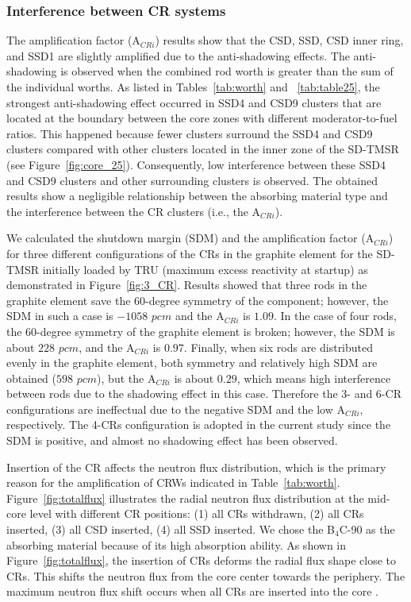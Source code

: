 \subsubsection{Interference between CR systems}

The amplification factor (A$_{CRi}$) results show that the CSD, SSD, CSD inner 
ring, and SSD1 are slightly amplified due to the anti-shadowing effects. The 
anti-shadowing is observed when the combined rod worth is greater than the sum 
of the individual worths. As listed in Tables~\ref{tab:worth} and ~\ref{tab:table25}, the strongest anti-shadowing effect occurred in 
SSD4 and CSD9 clusters that are located at the boundary between the core zones 
with different moderator-to-fuel ratios. This happened because fewer clusters surround the SSD4 and CSD9 clusters compared with other clusters located in the inner zone of the SD-TMSR (see Figure~\ref{fig:core_25}). Consequently, low interference between these SSD4 and CSD9 clusters and other surrounding clusters is observed. The obtained results show a negligible relationship between the absorbing material type and the interference between the CR clusters (i.e., the A$_{CRi}$).

We calculated the shutdown margin (SDM) and the amplification factor (A$_{CRi}$) for three different configurations of the CRs in the graphite element for the SD-TMSR initially loaded by TRU (maximum excess reactivity at startup) as demonstrated in Figure~\ref{fig:3_CR}. Results showed that three rods in the graphite element save the 60-degree symmetry of the component; however, the SDM in such a case is $-1058$ $pcm$ and the A$_{CRi}$ is $1.09$. In the case of four rods, the 60-degree symmetry of the graphite element is broken; however, the SDM is about $228$ $pcm$, and the A$_{CRi}$ is $0.97$. Finally, when six rods are distributed evenly in the graphite element, both symmetry and relatively high SDM are obtained ($598$ $pcm$), but the A$_{CRi}$ is about $0.29$, which means high interference between rods due to the shadowing effect in this case. Therefore the 3- and 6-CR configurations are ineffectual due to the negative SDM and the low A$_{CRi}$, respectively. The 4-CRs configuration is adopted in the current study since the SDM is positive, and almost no shadowing effect has been observed.

Insertion of the CR affects the neutron flux distribution, which is 
the primary reason for the amplification of CRWs indicated in 
Table~\ref{tab:worth}. Figure~\ref{fig:totalflux} illustrates the radial 
neutron flux distribution at the mid-core level with different CR positions: 
(1) all CRs withdrawn, (2) all CRs inserted, (3) all CSD inserted, (4) all SSD 
inserted. We chose the B$_4$C-90 as the absorbing material because of its high 
absorption ability. As shown in Figure~\ref{fig:totalflux}, the insertion of 
CRs deforms the radial flux shape close to CRs.
This shifts the neutron flux from the core center towards the 
periphery. The maximum neutron flux shift occurs when all CRs are inserted 
into the core \cite{girardin2007control}.

